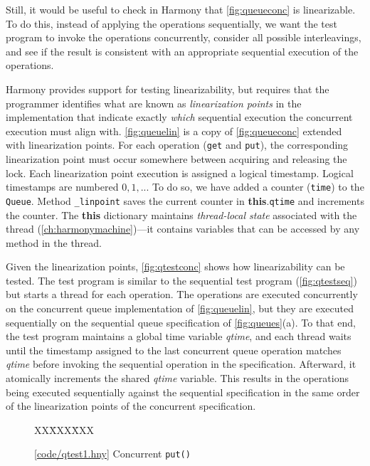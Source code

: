 \documentclass{report}
\newcommand{\harmonysource}[1]{
\begin{tabbing}
XX\=XXX\=XXX\kill
    
\end{tabbing}
}
\newcommand{\harmonylink}[1]{%
[\href{https://harmony.cs.cornell.edu/#1}{\underline{#1}}]%
}
\newenvironment{code}{
\tcolorbox
}{
\endtcolorbox
}
\begin{document}
Still, it would be useful to check in Harmony that
\autoref{fig:queueconc} is linearizable.
To do this, instead of applying the operations sequentially,
we want the test program to invoke the operations concurrently,
consider all possible interleavings, and see if the result
is consistent with an appropriate sequential execution of the
operations.

%
Harmony provides support for testing linearizability,
but requires that the programmer
identifies what are known as \emph{linearization points}
in the implementation that indicate exactly \emph{which} sequential
execution the concurrent execution must align with.
\autoref{fig:queuelin} is a copy of \autoref{fig:queueconc} extended with
linearization points.
For each operation (\texttt{get} and \texttt{put}), the corresponding
linearization point must occur somewhere between acquiring and releasing
the lock.
%
Each linearization point execution is assigned a logical timestamp.
Logical timestamps are numbered $0, 1, ...$
To do so, we have added a counter (\texttt{time}) to the \texttt{Queue}.
Method \texttt{\_linpoint} saves the current counter in
\textbf{this}.\texttt{qtime} and increments the counter.
The \textbf{this} dictionary maintains \emph{thread-local state} associated
with the thread (\autoref{ch:harmonymachine})---it contains variables that
can be accessed by any method in the thread.

Given the linearization points, \autoref{fig:qtestconc} shows how
linearizability can be tested.
The test program is similar to the sequential test program
(\autoref{fig:qtestseq}) but starts a thread for each operation.
The operations are executed concurrently on the concurrent queue
implementation of \autoref{fig:queuelin}, but they are executed sequentially
on the sequential queue specification of \autoref{fig:queues}(a).
To that end, the test program maintains a global time variable
\textit{qtime}, and each thread waits until the timestamp assigned to
the last concurrent queue operation matches \textit{qtime} before invoking
the sequential operation in the specification.
Afterward, it atomically increments the shared \textit{qtime} variable.
This results in the operations being executed sequentially against the
sequential specification in the same order of the linearization points
of the concurrent specification.

\begin{figure}
\begin{code}
\harmonysource{qtest1}
\end{code}
\caption{\harmonylink{code/qtest1.hny} Concurrent \texttt{put()}}
\label{fig:qtest1}
\end{figure}
\end{document}
